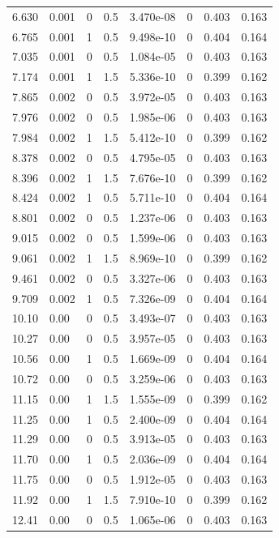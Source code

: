 \documentclass[preview]{standalone}
\begin{document}
{{\begin{tabular}{L{1.2cm}C{1.2cm} C{0.3cm}C{0.5cm} C{1.4cm}C{1.4cm} C{1.4cm}C{1.4cm}}
  6.630  &  0.001  & 0     & 0.5 &  3.470e-08  & 0  & 0.403 &  0.163   \\ 
  6.765  &  0.001  & 1     & 0.5 &  9.498e-10  & 0  & 0.404 &  0.164   \\ 
  7.035  &  0.001  & 0     & 0.5 &  1.084e-05  & 0  & 0.403 &  0.163   \\ 
  7.174  &  0.001  & 1     & 1.5 &  5.336e-10  & 0  & 0.399 &  0.162   \\ 
  7.865  &  0.002  & 0     & 0.5 &  3.972e-05  & 0  & 0.403 &  0.163   \\ 
  7.976  &  0.002  & 0     & 0.5 &  1.985e-06  & 0  & 0.403 &  0.163   \\ 
  7.984  &  0.002  & 1     & 1.5 &  5.412e-10  & 0  & 0.399 &  0.162   \\ 
  8.378  &  0.002  & 0     & 0.5 &  4.795e-05  & 0  & 0.403 &  0.163   \\ 
  8.396  &  0.002  & 1     & 1.5 &  7.676e-10  & 0  & 0.399 &  0.162   \\ 
  8.424  &  0.002  & 1     & 0.5 &  5.711e-10  & 0  & 0.404 &  0.164   \\ 
  8.801  &  0.002  & 0     & 0.5 &  1.237e-06  & 0  & 0.403 &  0.163   \\ 
  9.015  &  0.002  & 0     & 0.5 &  1.599e-06  & 0  & 0.403 &  0.163   \\ 
  9.061  &  0.002  & 1     & 1.5 &  8.969e-10  & 0  & 0.399 &  0.162   \\ 
  9.461  &  0.002  & 0     & 0.5 &  3.327e-06  & 0  & 0.403 &  0.163   \\ 
  9.709  &  0.002  & 1     & 0.5 &  7.326e-09  & 0  & 0.404 &  0.164   \\ 
  10.10  &  0.00  & 0     & 0.5 &  3.493e-07  & 0  & 0.403 &  0.163   \\ 
  10.27  &  0.00  & 0     & 0.5 &  3.957e-05  & 0  & 0.403 &  0.163   \\ 
  10.56  &  0.00  & 1     & 0.5 &  1.669e-09  & 0  & 0.404 &  0.164   \\ 
  10.72  &  0.00  & 0     & 0.5 &  3.259e-06  & 0  & 0.403 &  0.163   \\ 
  11.15  &  0.00  & 1     & 1.5 &  1.555e-09  & 0  & 0.399 &  0.162   \\ 
  11.25  &  0.00  & 1     & 0.5 &  2.400e-09  & 0  & 0.404 &  0.164   \\ 
  11.29  &  0.00  & 0     & 0.5 &  3.913e-05  & 0  & 0.403 &  0.163   \\ 
  11.70  &  0.00  & 1     & 0.5 &  2.036e-09  & 0  & 0.404 &  0.164   \\ 
  11.75  &  0.00  & 0     & 0.5 &  1.912e-05  & 0  & 0.403 &  0.163   \\ 
  11.92  &  0.00  & 1     & 1.5 &  7.910e-10  & 0  & 0.399 &  0.162   \\ 
  12.41  &  0.00  & 0     & 0.5 &  1.065e-06  & 0  & 0.403 &  0.163   \\ 
\hline 
\end{tabular} 

}}
\end{document}
